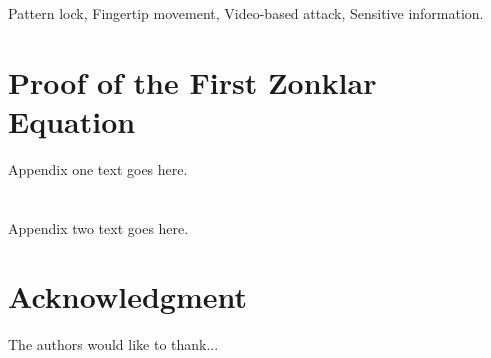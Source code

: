 \documentclass[journal]{IEEEtran}
\begin{document}
\begin{IEEEkeywords}
    Pattern lock, Fingertip movement, Video-based attack, Sensitive information.
\end{IEEEkeywords}














%
\IEEEpeerreviewmaketitle





\appendices
\section{Proof of the First Zonklar Equation}
Appendix one text goes here.

\section{}
Appendix two text goes here.


\section*{Acknowledgment}


The authors would like to thank...


\ifCLASSOPTIONcaptionsoff
  \newpage
\fi




\balance


%
%
\end{document}
